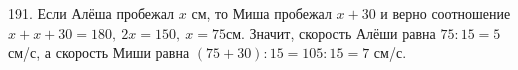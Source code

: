 191. Если Алёша пробежал $x$ см, то Миша пробежал $x+30$ и верно соотношение $x+x+30=180,\ 2x=150,\ x=75$см. Значит, скорость Алёши равна $75:15=5$ см/с, а скорость Миши равна $(75+30):15=105:15=7$ см/с.\\
